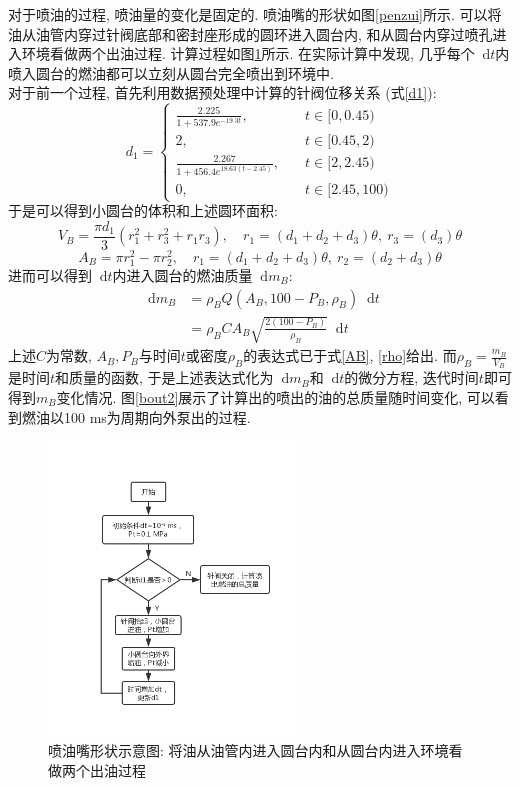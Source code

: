 \documentclass{cumcmthesis}
\renewcommand\d{\mathop{}\!\mathrm{d}}
\newcommand{\f}[2]{\frac{#1}{#2}}
\newcommand{\ar}[1]{
        \begin{aligned}                              %
            #1
        \end{aligned}   }
\newcommand{\x}{&=}
\newcommand{\hua}[1]{\left\{\begin{aligned}
    #1
    \end{aligned}\right.}
\begin{document}
对于喷油的过程, 喷油量的变化是固定的. 喷油嘴的形状如图\ref{penzui}所示. 可以将油从油管内穿过针阀底部和密封座形成的圆环进入圆台内, 和从圆台内穿过喷孔进入环境看做两个出油过程. 计算过程如图\ref{bout}所示. 在实际计算中发现, 几乎每个$\d t$内喷入圆台的燃油都可以立刻从圆台完全喷出到环境中. \\
对于前一个过程, 首先利用数据预处理中计算的针阀位移关系 (式\ref{d1}):
$$d_1 = \hua{
    \f{2.225}{1+537.9e^{-19.3t}}, &\quad t\in[0,0.45)\\
    2,&\quad t\in[0.45,2)\\
    \f{2.267}{1+456.4e^{18.63(t-2.45)}}, &\quad t\in[2,2.45)\\
    0,&\quad t\in[2.45, 100)
}$$
于是可以得到小圆台的体积和上述圆环面积:
\begin{equation}
    V_{B} = \frac{\pi d_1}{3}\left(r_1^{2}+r_3^{2}+r_1 r_3\right),\quad r_1 = (d_1+d_2+d_3)\theta,\ r_3=(d_3)\theta
    \label{VB}
\end{equation}
\begin{equation}
    A_{B} = \pi r_1^2-\pi r_2^2, \quad r_1 = (d_1+d_2+d_3)\theta,\ r_2=(d_2+d_3)\theta
    \label{AB}
\end{equation}
进而可以得到$\d t$内进入圆台的燃油质量$\d m_B$:
$$\ar{\d m_B \x \rho_BQ(A_B,100-P_B,\rho_B)\d t\\
    \x \rho_B CA_B\sqrt{\f{2(100-P_B)}{\rho_B}}\d t
}$$
上述$C$为常数, $A_B, P_B$与时间$t$或密度$\rho_B$的表达式已于式\ref{AB}, \ref{rho}给出. 而$\rho_B=\f{m_B}{V_B}$是时间$t$和质量的函数, 于是上述表达式化为$\d m_B$和$\d t$的微分方程, 迭代时间$t$即可得到$m_B$变化情况. 图\ref{bout2}展示了计算出的喷出的油的总质量随时间变化, 可以看到燃油以100 ms为周期向外泵出的过程. 

\begin{figure}[htbp]
    \centering
    \includegraphics[width=0.6\textwidth]{bout.jpg} 
    \caption{喷油嘴形状示意图: 将油从油管内进入圆台内和从圆台内进入环境看做两个出油过程}
    \label{bout}
\end{figure}
\end{document}
